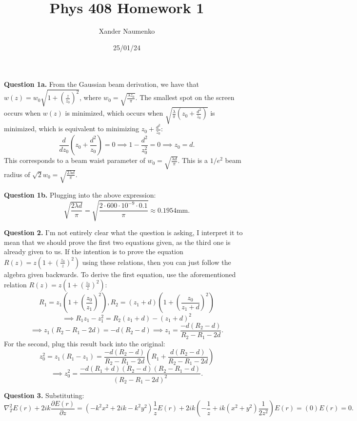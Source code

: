 \documentclass[letterpaper, reqno,11pt]{article}
\begin{document}
\title{Phys 408 Homework 1}
\date{25/01/24}
\author{Xander Naumenko}
\maketitle

{\medskip\noindent\bf Question 1a.} From the Gaussian beam derivation, we have that $w(z)=w_0\sqrt{1+\left( \frac{z}{z_0} \right) ^2}$, where $w_0=\sqrt{\frac{\lambda z_0}{\pi}}$. The smallest spot on the screen occurs when $w(z)$ is minimized, which occurs when $\sqrt{\frac{\lambda}{\pi}\left( z_0+ \frac{d^2}{z_0} \right) }$ is minimized, which is equivalent to minimizing $z_0+\frac{d^2}{z_0}$:
\[
    \frac{d}{dz_0}\left( z_0 + \frac{d^2}{z_0}\right) =0 \implies 1-\frac{d^2}{z_0^2}=0 \implies z_0=d
.\]
This corresponds to a beam waist parameter of $w_0= \sqrt{\frac{\lambda d}{\pi}}$. This is a $1 /e^2$ beam radius of $\sqrt{2}w_0= \sqrt{\frac{2\lambda d}{\pi}}$.

{\medskip\noindent\bf Question 1b.} Plugging into the above expression:
\[
\sqrt{\frac{2\lambda d}{\pi}}= \sqrt{\frac{2\cdot 600\cdot 10^{-9}\cdot 0.1}{\pi}}\approx 0.1954 \text{mm}
.\]

{\medskip\noindent\bf Question 2.} I'm not entirely clear what the question is asking, I interpret it to mean that we should prove the first two equations given, as the third one is already given to us. If the intention is to prove the equation $R(z)=z \left( 1+\left( \frac{z_0}{z} \right) ^2 \right) $ using these relations, then you can just follow the algebra given backwards. To derive the first equation, use the aforementioned relation $R(z)=z \left( 1+\left( \frac{z_0}{z} \right) ^2 \right) $:
\[
R_1=z_1 \left( 1+\left( \frac{z_0}{z_1} \right) ^2 \right), R_2=\left( z_1+d \right)  \left( 1+\left( \frac{z_0}{z_1+d} \right) ^2 \right)
\]
\[
\implies R_1z_1-z_1^2=R_2\left( z_1+d \right) -(z_1+d)^2
\]
\[
\implies z_1\left( R_2-R_1-2d \right) =-d\left( R_2-d \right) \implies z_1= \frac{-d\left( R_2-d \right) }{R_2-R_1-2d}
.\]
For the second, plug this result back into the original:
\[
z_0^2=z_1(R_1-z_1)= \frac{-d(R_2-d)}{R_2-R_1-2d}\left( R_1+\frac{d(R_2-d)}{R_2-R_1-2d} \right) 
\]
\[
\implies z_0^2= \frac{-d(R_1+d)(R_2-d)(R_2-R_1-d)}{\left( R_2-R_1-2d \right) ^2}
.\]

{\medskip\noindent\bf Question 3.} Substituting:
\[
\nabla_T^2 E(r)+2ik \frac{\partial E(r)}{\partial z}=(-k^2x^2+2ik-k^2y^2) \frac{1}{z}E(r)+2ik\left( -\frac{1}{z}+ik(x^2+y^2) \frac{1}{2z^2} \right)E(r)=(0)E(r)=0
.\]
\end{document}
